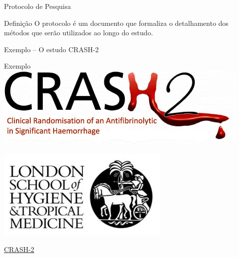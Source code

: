\documentclass{beamer}
\begin{document}
\begin{frame}{Protocolo de Pesquisa}
  \begin{block}{Definição}
    \footnotesize
    O protocolo é um documento que formaliza o detalhamento dos métodos que serão utilizados ao longo do estudo.
  \end{block}
\end{frame}

\begin{frame}{Exemplo -- O estudo CRASH-2}
  \begin{exampleblock}{Exemplo}
    \centering
    \includegraphics[width=.8\textwidth]{Planejamento/C2logoNew}

    \bigskip
    \includegraphics[width=.4\textwidth]{Planejamento/Lshtm_newlogo}
  \end{exampleblock}
  \vfill
  \scriptsize
  \hfill \href{http://www.crash2.lshtm.ac.uk/}{CRASH-2}
\end{frame}
\end{document}
